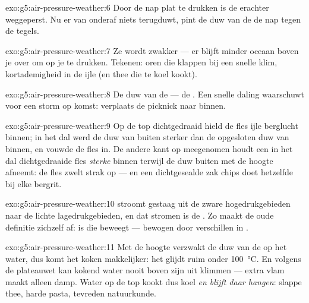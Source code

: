 \begin{solution}{exo:g5:air-pressure-weather:6}
Door de nap plat te drukken is de  erachter weggeperst. Nu er van
onderaf niets terugduwt, pint de duw van de  de nap tegen de
tegels.
\end{solution}

\begin{solution}{exo:g5:air-pressure-weather:7}
Ze wordt zwakker --- er blijft minder oceaan  boven je over om op
je te drukken. Tekenen: oren die klappen bij een snelle klim,
kortademigheid in de ijle  (en thee die te koel kookt).
\end{solution}

\begin{solution}{exo:g5:air-pressure-weather:8}
De duw van de  --- de . Een snelle daling
waarschuwt voor een storm op komst: verplaats de picknick naar binnen.
\end{solution}

\begin{solution}{exo:g5:air-pressure-weather:9}
Op de top dichtgedraaid hield de fles ijle berglucht binnen; in het
dal werd de duw van buiten sterker dan de opgesloten duw van binnen,
en vouwde de fles in. De andere kant op meegenomen houdt een in het
dal dichtgedraaide fles \emph{sterke}  binnen terwijl de duw
buiten met de hoogte afneemt: de fles zwelt strak op --- en een
dichtgesealde zak chips doet hetzelfde bij elke bergrit.
\end{solution}

\begin{solution}{exo:g5:air-pressure-weather:10}
 stroomt gestaag uit de zware hogedrukgebieden naar de lichte
lagedrukgebieden, en dat stromen is de . Zo maakt de oude
definitie zichzelf af:  is  die beweegt --- bewogen door
verschillen in .
\end{solution}

\begin{solution}{exo:g5:air-pressure-weather:11}
Met de hoogte verzwakt de duw van de  op het water, dus
komt het koken makkelijker: het  glijdt ruim onder
\qty{100}{\celsius}. En volgens de plateauwet kan kokend water nooit
boven zijn  uit klimmen --- extra vlam maakt alleen damp.
Water op de top kookt dus koel \emph{en blijft daar hangen}: slappe
thee, harde pasta, tevreden natuurkunde.
\end{solution}
